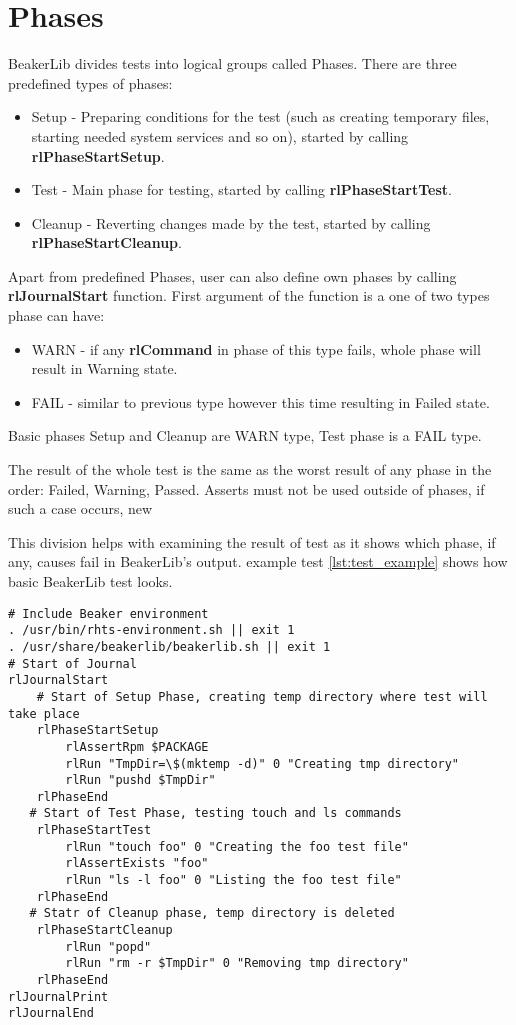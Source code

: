 \section{Phases}
BeakerLib divides tests into logical groups called Phases. There are three predefined types of phases:
\begin{itemize}
\item Setup - Preparing conditions for the test (such as creating temporary files, starting needed system services and so on), started by calling \textbf{rlPhaseStartSetup}.
\item Test - Main phase for testing, started by calling \textbf{rlPhaseStartTest}.
\item Cleanup - Reverting changes made by the test, started by calling \mbox{\textbf{rlPhaseStartCleanup}}.
\end{itemize}

Apart from predefined Phases, user can also define own phases by calling \textbf{rlJournalStart} function. First argument of the function is a one of two types phase can have:

\begin{itemize}
\item WARN - if any \textbf{rlCommand} in phase of this type fails, whole phase will result in Warning state.
\item FAIL - similar to previous type however this time resulting in Failed state.
\end{itemize}

Basic phases Setup and Cleanup are WARN type, Test phase is a FAIL type.

The result of the whole test is the same as the worst result of any phase in the order: Failed, Warning, Passed.
Asserts must not be used outside of phases, if such a case occurs, new  

This division helps with examining the result of test as it shows which phase, if any, causes fail in BeakerLib's output. 
example test \ref{lst:test_example} shows how basic BeakerLib test looks.
\\
\begin{lstlisting}[style=beakerlib_bash,caption={BeakerLib basic test example},label={lst:test_example}]
# Include Beaker environment
. /usr/bin/rhts-environment.sh || exit 1
. /usr/share/beakerlib/beakerlib.sh || exit 1
# Start of Journal
rlJournalStart
    # Start of Setup Phase, creating temp directory where test will take place 
    rlPhaseStartSetup
        rlAssertRpm $PACKAGE
        rlRun "TmpDir=\$(mktemp -d)" 0 "Creating tmp directory"
        rlRun "pushd $TmpDir"
    rlPhaseEnd
   # Start of Test Phase, testing touch and ls commands
    rlPhaseStartTest
        rlRun "touch foo" 0 "Creating the foo test file"
        rlAssertExists "foo"
        rlRun "ls -l foo" 0 "Listing the foo test file"
    rlPhaseEnd
   # Statr of Cleanup phase, temp directory is deleted
    rlPhaseStartCleanup
        rlRun "popd"
        rlRun "rm -r $TmpDir" 0 "Removing tmp directory"
    rlPhaseEnd
rlJournalPrint
rlJournalEnd
\end{lstlisting}

